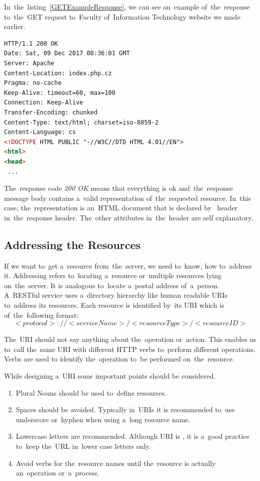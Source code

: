 In~the~listing~\ref{GETExampleResponse}, we can see an~example
of~the~response to~the~GET request to~Faculty
of~Information Technology website we made earlier.

\vspace{2mm}
\begin{lstlisting}[caption=A~sample of~a~simplified response to~a~GET Request.,
label=GETExampleResponse, language=HTML]
HTTP/1.1 200 OK
Date: Sat, 09 Dec 2017 08:36:01 GMT
Server: Apache
Content-Location: index.php.cz
Pragma: no-cache
Keep-Alive: timeout=60, max=100
Connection: Keep-Alive
Transfer-Encoding: chunked
Content-Type: text/html; charset=iso-8859-2
Content-Language: cs
<!DOCTYPE HTML PUBLIC "-//W3C//DTD HTML 4.01//EN">
<html>
<head>
 ...
\end{lstlisting}

The~response code \textit{200 OK} means that everything is ok
and~the~response message body contains a~valid representation of~the~requested resource.
In~this case, the~representation is an~HTML document that is declared
by~ header in~the~response header. The~other attributes
in~the~header are self explanatory.

\subsection{Addressing the Resources}
If we want to~get a~resource from~the~server, we need to~know, how to~address
it. Addressing refers to~locating a~resource or~multiple resources lying
on~the~server. It is analogous to~locate a~postal address of~a~person. A~RESTful
service uses a~directory hierarchy like human readable URIs to~address its
resources. Each resource is identified by~its URI which is of~the~following
format:
\begin{equation*}
<protocol>://<serviceName>/<resourceType>/<resourceID>
\end{equation*}

The~URI should not say anything about the~operation or~action. This enables us
to~call the~same URI with different HTTP verbs to~perform different operations.
Verbs are used to identify the~operation to~be performed on~the~resource.

While designing a~URI some important points should be considered.

\begin{enumerate}
  \item Plural Nouns should be used to~define resources.
  \item Spaces should be avoided. Typically in~URIs it is recommended
  to~use underscore or~hyphen when using a~long resource name.
  \item Lowercase letters are recommended. Although URI is
  , it is a~good practice to~keep the~URL in~lower case
  letters only.
  \item Avoid verbs for the~resource names until the~resource is
  actually an~operation or~a~process. 
\end{enumerate}

